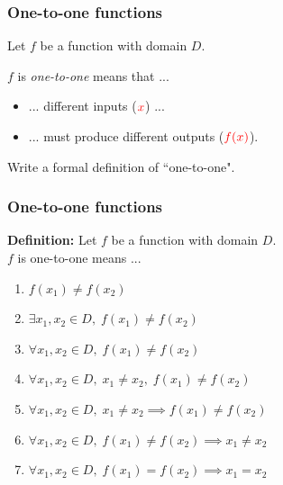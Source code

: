 \documentclass[14pt]{beamer}
\begin{document}
\begin{frame}
	\frametitle{One-to-one functions}

	Let $f$ be a function with domain $D$. \\

	\vfill

	$f$ is \emph{one-to-one} means that ...
	\begin{itemize}
		\item ... different inputs (${\color{red} x}$) ...

		\item ... must produce different outputs (${\color{red} f(x)}$).
	\end{itemize}

	\vfill

	\begin{block}{}
		Write a formal definition of ``one-to-one".
	\end{block}
\end{frame}

\begin{frame}
	\frametitle{One-to-one functions}

	{\bfseries Definition:} Let $f$ be a function with domain $D$. \\ $f$ is one-to-one
	means ...
	\begin{enumerate}
		\item $\displaystyle f(x_{1}) \neq f(x_{2})$

		\item $\displaystyle \exists x_{1}, x_{2}\in D, \; f(x_{1}) \neq f(x_{2})$

		\item $\displaystyle \forall x_{1}, x_{2}\in D, \; f(x_{1}) \neq f(x_{2})$

		\item $\displaystyle \forall x_{1}, x_{2}\in D, \; x_{1}\neq x_{2}, \; f(x_{1}
			) \neq f(x_{2})$

		\item $\displaystyle \forall x_{1}, x_{2}\in D, \; x_{1}\neq x_{2}\implies f(
			x_{1}) \neq f(x_{2})$

		\item $\displaystyle \forall x_{1}, x_{2}\in D, \; f(x_{1}) \neq f(x_{2}) \implies
			x_{1}\neq x_{2}$

		\item $\displaystyle \forall x_{1}, x_{2}\in D, \; f(x_{1}) = f(x_{2}) \implies
			x_{1}= x_{2}$
	\end{enumerate}
\end{frame}
\end{document}
